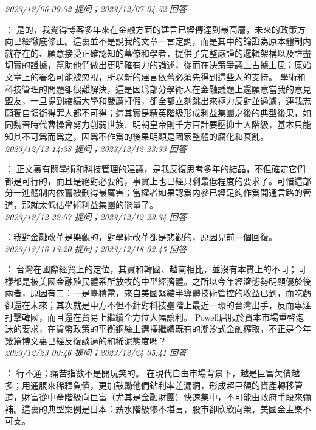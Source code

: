 \documentclass[twocolumn]{ctexart}
\begin{document}
\textit{\hfill\noindent\small 2023/12/06 09:52 提问；2023/12/07 04:52 回答}

：
是的，我覺得博客多年來在金融方面的建言已經傳達到最高層，未來的政策方向已經徹底修正。這裏並不是說我的文章一言定調，而是其中的論證為原本體制内就存在的、願意接受正確認知的幕僚和學者，提供了完整嚴謹的邏輯架構以及詳盡切實的證據，幫助他們做出更明確有力的論述，從而在決策爭議上占據上風；原始文章上的署名可能被忽視，所以新的建言依舊必須先得到這些人的支持。
學術和科技管理的問題卻很難解決，這是因爲部分學術人在金融議題上還願意當我的意見盟友，一旦提到縮編大學和嚴厲打假，卻全都立刻跳出來極力反對並過濾，連我志願獨自領銜得罪人都不可得；這其實是精英階級形成利益集團之後的典型後果，如同魏晉時代曹操曾努力削弱世族、明朝皇帝則千方百計要壓抑士人階級，基本只能知其不可爲而爲之，因爲不作爲的後果明顯是國家整體的腐化和衰亂。
\\

\textit{\hfill\noindent\small 2023/12/12 14:38 提问；2023/12/12 23:33 回答}

：
正文裏有關學術和科技管理的建議，是我反復思考多年的結晶，不但確定它們都是可行的，而且是絕對必要的，事實上也已經只剩最低程度的要求了。可惜這部分一進體制内依舊被刪得最厲害；當權者如果認爲内參已經足夠作爲開通言路的管道，那就太低估學術利益集團的能量了。
\\

\textit{\hfill\noindent\small 2023/12/12 22:57 提问；2023/12/12 23:34 回答}

：我對金融改革是樂觀的，對學術改革卻是悲觀的，原因見前一個回復。
\\

\textit{\hfill\noindent\small 2023/12/16 13:20 提问；2023/12/18 02:45 回答}

：
台灣在國際經貿上的定位，其實和韓國、越南相比，並沒有本質上的不同；同樣都是被美國金融殖民體系所放牧的中型經濟體。之所以今年經濟態勢明顯優於後兩者，原因有二：一是臺積電，來自美國緊縮半導體技術管控的收益已到，而吃虧卻還在未來；其次就是中方不但不針對科技臺階上最近一環的台灣出手，反而專注打擊韓國，而且還在貿易上繼續全方位大幅讓利。
Powell屈服於資本市場重啓泡沫的要求，在貨幣政策的平衡鋼絲上選擇繼續既有的潮汐式金融榨取，不正是今年幾篇博文裏已經反復談過的和稀泥態度嗎？
\\

\textit{\hfill\noindent\small 2023/12/23 00:46 提问；2023/12/24 05:41 回答}

：
行不通；痛苦指數不是開玩笑的。
在現代自由市場背景下，越是巨富欠債越多；用通脹來稀釋負債，更加鼓勵他們鉆利率差漏洞，形成超巨額的資產轉移管道，財富從中產階級向巨富（尤其是金融財團）快速集中，不可能由政府手段來彌補。這裏的典型案例是日本：薪水階級慘不堪言，股市卻欣欣向榮，美國金主樂不可支。
\\
\end{document}
